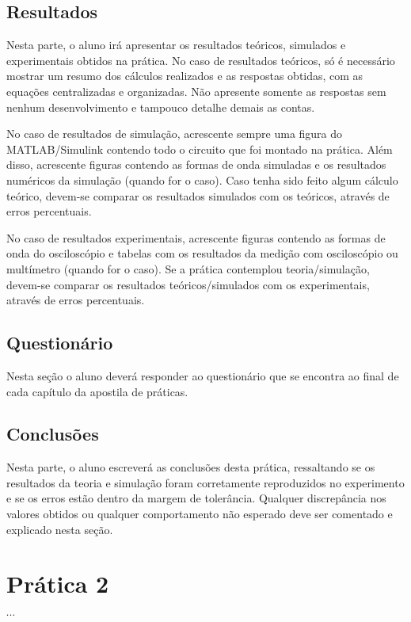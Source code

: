 \documentclass[12pt]{article}
\begin{document}
\subsection{Resultados}
\label{sec:orgb2933c1}
Nesta parte, o aluno irá apresentar os resultados teóricos, simulados e experimentais obtidos na prática.
No caso de resultados teóricos, só é necessário mostrar um resumo dos cálculos realizados e as respostas obtidas, com as equações centralizadas e organizadas. Não apresente somente as respostas sem nenhum desenvolvimento e tampouco detalhe demais as contas.

No caso de resultados de simulação, acrescente sempre uma figura do MATLAB/Simulink contendo todo o circuito que foi montado na prática. Além disso, acrescente figuras contendo as formas de onda simuladas e os resultados numéricos da simulação (quando for o caso). Caso tenha sido feito algum cálculo teórico, devem-se comparar os resultados simulados com os teóricos, através de erros percentuais.

No caso de resultados experimentais, acrescente figuras contendo as formas de onda do osciloscópio e tabelas com os resultados da medição com osciloscópio ou multímetro (quando for o caso). Se a prática contemplou teoria/simulação, devem-se comparar os resultados teóricos/simulados com os experimentais, através de erros percentuais.

\subsection{Questionário}
\label{sec:org5ecb930}
Nesta seção o aluno deverá responder ao questionário que se encontra ao final de cada capítulo da apostila de práticas.

\subsection{Conclusões}
\label{sec:org7736a38}

Nesta parte, o aluno escreverá as conclusões desta prática, ressaltando se os resultados da teoria e simulação foram corretamente reproduzidos no experimento e se os erros estão dentro da margem de tolerância. Qualquer discrepância nos valores obtidos ou qualquer comportamento não esperado deve ser comentado e explicado nesta seção.

\section{Prática 2}
\label{sec:orga0560e8}
\(\cdots\)
\end{document}
